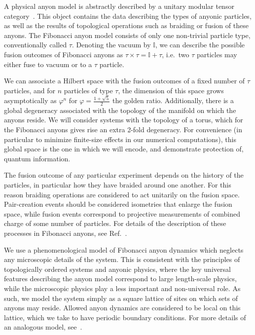 \documentclass[aps, prl, letterpaper, twocolumn, superscriptaddress, notitlepage]{revtex4-1}
\begin{document}
	A physical anyon model is abstractly described by a unitary modular tensor category~\cite{Wang2010b}. This object contains the data describing the types of anyonic particles, as well as the results of topological operations such as braiding or fusion of these anyons. The Fibonacci anyon model consists of only one non-trivial particle type, conventionally called $\tau$. Denoting the vacuum by $\mathbb{I}$, we can describe the possible fusion outcomes of Fibonacci anyons as $\tau\times\tau=\mathbb{I}+\tau$, i.e.~two $\tau$ particles may either fuse to vacuum or to a $\tau$ particle.

	We can associate a Hilbert space with the fusion outcomes of a fixed number of $\tau$ particles, and for $n$ particles of type $\tau$, the dimension of this space grows asymptotically as $\varphi^n$ for $\varphi=\frac{1+\sqrt{5}}{2}$ the golden ratio. Additionally, there is a global degeneracy associated with the topology of the manifold on which the anyons reside. We will consider systems with the topology of a torus, which for the Fibonacci anyons gives rise an extra 2-fold degeneracy. For convenience (in particular to minimize finite-size effects in our numerical computations), this global space is the one in which we will encode, and demonstrate protection of, quantum information.
	
	The fusion outcome of any particular experiment depends on the history of the particles, in particular how they have braided around one another. For this reason braiding operations are considered to act unitarily on the fusion space. Pair-creation events should be considered isometries that enlarge the fusion space, while fusion events correspond to projective measurements of combined charge of some number of particles. For details of the description of these processes in Fibonacci anyons, see Ref.~\cite{Trebst2008}.

	We use a phenomenological model of Fibonacci anyon dynamics which neglects any microscopic details of the system. This is consistent with the principles of topologically ordered systems and anyonic physics, where the key universal features describing the anyon model correspond to large length-scale physics, while the microscopic physics play a less important and non-universal role. As such, we model the system simply as a square lattice of sites on which sets of anyons may reside. Allowed anyon dynamics are considered to be local on this lattice, which we take to have periodic boundary conditions. For more details of an analogous model, see~\cite{Brell2013}.
\end{document}
